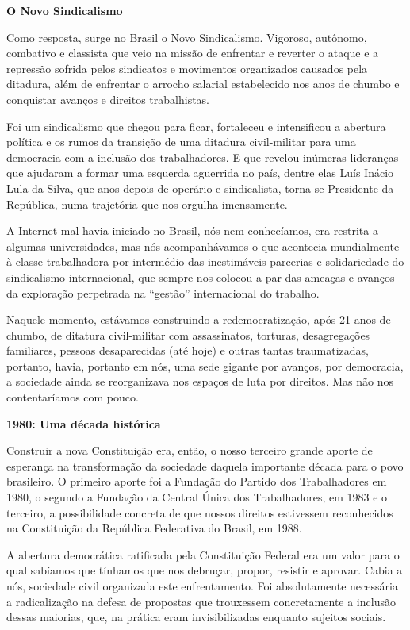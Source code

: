 \textbf{O Novo Sindicalismo}

Como resposta, surge no Brasil o Novo Sindicalismo. Vigoroso, autônomo,
combativo e classista que veio na missão de enfrentar e reverter o
ataque e a repressão sofrida pelos sindicatos e movimentos organizados
causados pela ditadura, além de enfrentar o arrocho salarial
estabelecido nos anos de chumbo e conquistar avanços e direitos
trabalhistas.

Foi um sindicalismo que chegou para ficar, fortaleceu e intensificou a
abertura política e os rumos da transição de uma ditadura civil-militar
para uma democracia com a inclusão dos trabalhadores. E que revelou
inúmeras lideranças que ajudaram a formar uma esquerda aguerrida no
país, dentre elas Luís Inácio Lula da Silva, que anos depois de operário
e sindicalista, torna-se Presidente da República, numa trajetória que
nos orgulha imensamente.

A Internet mal havia iniciado no Brasil, nós nem conhecíamos, era
restrita a algumas universidades, mas nós acompanhávamos o que acontecia
mundialmente à classe trabalhadora por intermédio das inestimáveis
parcerias e solidariedade do sindicalismo internacional, que sempre nos
colocou a par das ameaças e avanços da exploração perpetrada na
``gestão'' internacional do trabalho.

Naquele momento, estávamos construindo a redemocratização, após 21 anos
de chumbo, de ditatura civil-militar com assassinatos, torturas,
desagregações familiares, pessoas desaparecidas (até hoje) e outras
tantas traumatizadas, portanto, havia, portanto em nós, uma sede gigante
por avanços, por democracia, a sociedade ainda se reorganizava nos
espaços de luta por direitos. Mas não nos contentaríamos com pouco.

\textbf{1980: Uma década histórica}

Construir a nova Constituição era, então, o nosso terceiro grande aporte
de esperança na transformação da sociedade daquela importante década
para o povo brasileiro. O primeiro aporte foi a Fundação do Partido dos
Trabalhadores em 1980, o segundo a Fundação da Central Única dos
Trabalhadores, em 1983 e o terceiro, a possibilidade concreta de que
nossos direitos estivessem reconhecidos na Constituição da República
Federativa do Brasil, em 1988.

A abertura democrática ratificada pela Constituição Federal era um valor
para o qual sabíamos que tínhamos que nos debruçar, propor, resistir e
aprovar. Cabia a nós, sociedade civil organizada este enfrentamento. Foi
absolutamente necessária a radicalização na defesa de propostas que
trouxessem concretamente a inclusão dessas maiorias, que, na prática
eram invisibilizadas enquanto sujeitos sociais.

